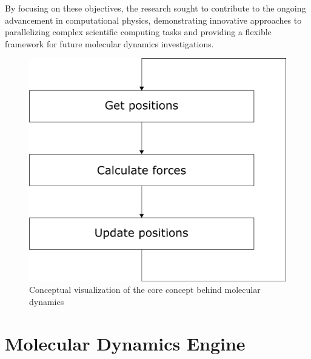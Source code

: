 \documentclass[conference]{IEEEtran}
\begin{document}

By focusing on these objectives, the research sought to contribute to the ongoing advancement in computational 
physics, demonstrating innovative approaches to parallelizing complex scientific computing tasks and providing 
a flexible framework for future molecular dynamics investigations.

\begin{figure}[H]
    \centering
    \includegraphics[width=0.7\linewidth]{images/verlet_concept.png}
    \caption{Conceptual visualization of the core concept behind molecular dynamics}\label{fig:overview}
\end{figure}


\section{Molecular Dynamics Engine}\label{md}
\end{document}
